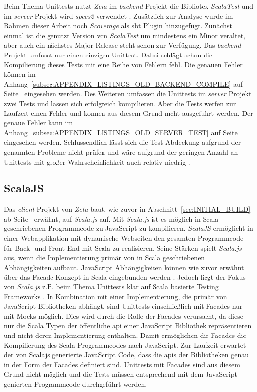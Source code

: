 Beim Thema Unittests nutzt \textit{Zeta} im \textit{backend} Projekt die Bibliotek \textit{ScalaTest} und im \textit{server} Projekt wird \textit{specs2} verwendet \cite{scalatest_project,specs2}. Zusätzlich zur Analyse wurde im Rahmen dieser Arbeit noch \textit{Scoverage} als \ac{sbt} Plugin hinzugefügt. Zunächst einmal ist die genutzt Version von \textit{ScalaTest} um mindestens ein Minor veraltet, aber auch ein nächstes Major Release steht schon zur Verfügung. Das \textit{backend} Projekt umfasst nur einen einzigen Unittest. Dabei schlägt schon die Kompilierung dieses Tests mit eine Reihe von Fehlern fehl. Die genauen Fehler können im Anhang~\ref{subsec:APPENDIX_LISTINGS_OLD_BACKEND_COMPILE} auf Seite~\pageref{subsec:APPENDIX_LISTINGS_OLD_BACKEND_COMPILE} eingesehen werden. Des Weiteren umfassen die Unittests im \textit{server} Projekt zwei Tests und lassen sich erfolgreich kompilieren. Aber die Tests werfen zur Laufzeit einen Fehler und können aus diesem Grund nicht ausgeführt werden. Der genaue Fehler kann im Anhang~\ref{subsec:APPENDIX_LISTINGS_OLD_SERVER_TEST} auf Seite~\pageref{subsec:APPENDIX_LISTINGS_OLD_SERVER_TEST} eingesehen werden. Schlussendlich lässt sich die Test-Abdeckung aufgrund der genannten Probleme nicht prüfen und wäre aufgrund der geringen Anzahl an Unittests mit großer Wahrscheinlichkeit auch relativ niedrig \cite[Scoverage]{analys_old}.

\subsection{ScalaJS}

Das \textit{client} Projekt von \textit{Zeta} baut, wie zuvor in Abschnitt~\ref{sec:INITIAL_BUILD} ab Seite~\pageref{sec:INITIAL_BUILD} erwähnt, auf \textit{Scala.js} auf. Mit \textit{Scala.js} ist es möglich in Scala geschriebenen Programmcode zu JavaScript zu kompilieren. \textit{ScalaJS} ermöglicht in einer Webapplikation mit dynamische Webseiten den gesamten Programmcode für Back- und Front-End mit Scala zu realisieren. Seine Stärken spielt \textit{Scala.js} aus, wenn die Implementierung primär von in Scala geschriebenen Abhängigkeiten aufbaut. JavaScript Abhängigkeiten können wie zuvor erwähnt über das Facade Konzept in Scala eingebunden werden \cite{scalajs_facade}. Jedoch liegt der Fokus von \textit{Scala.js} z.B. beim Thema Unittests klar auf Scala basierte Testing Frameworks \cite{scalajs_testing}. In Kombination mit einer Implementierung, die primär von JavaScript Bibliotheken abhängt, sind Unittests einschließlich mit Facades nur mit Mocks möglich. Dies wird durch die Rolle der Facades verursacht, da diese nur die Scala Typen der öffentliche \ac{api} einer JavaScript Bibliothek repräsentieren und nicht deren Implementierung enthalten. Damit ermöglichen die Facades die Kompilierung des Scala Programmcodes nach JavaScript. Zur Laufzeit erwartet der von Scalajs generierte JavaScript Code, dass die \acp{api} der Bibliotheken genau in der Form der Facades definiert sind. Unittests mit Facades sind aus diesem Grund nicht möglich und die Tests müssen entsprechend mit dem JavaScript genierten Programmcode durchgeführt werden.

